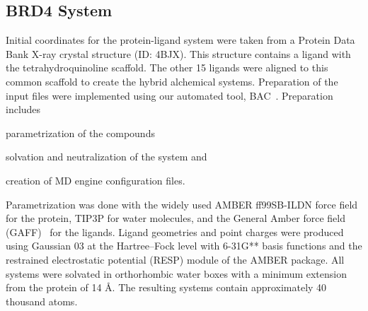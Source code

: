 \documentclass[conference]{IEEEtran}
\begin{document}
\subsection{BRD4 System}\label{sec:system_description}

Initial coordinates for the protein-ligand system were taken from a Protein 
Data Bank X-ray crystal structure (ID: 4BJX). This structure contains a ligand 
with the tetrahydroquinoline scaffold. The other 15 ligands were aligned to 
this common scaffold to create the hybrid alchemical systems. Preparation of 
the input files were implemented using our automated tool, 
BAC~\cite{Sadiq2008}. Preparation includes
\begin{enumerate*}[label=(\roman*)]
  \item parametrization of the compounds
  \item solvation and neutralization of the system and
  \item creation of MD engine configuration files.
\end{enumerate*}
Parametrization was done with the widely used AMBER ff99SB-ILDN force field  
for the protein, TIP3P for water molecules, and the General Amber force field 
(GAFF)~\cite{Wang2004} for the ligands. Ligand geometries and point charges 
were produced using Gaussian 03 at the Hartree–Fock level with 6-31G** basis 
functions and the restrained electrostatic potential (RESP) module of the AMBER 
package. All systems were solvated in orthorhombic water boxes with a minimum 
extension from the protein of 14 \AA. The resulting systems contain 
approximately 40 thousand atoms.





\end{document}

